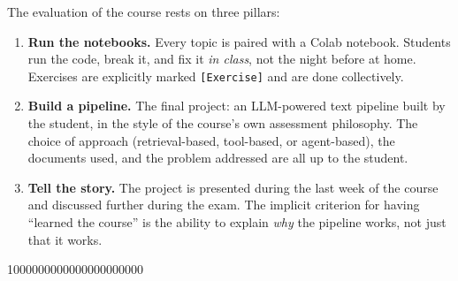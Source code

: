 The evaluation of the course rests on three pillars:

\begin{enumerate}
    \item \textbf{Run the notebooks.} Every topic is paired with a Colab notebook. Students run the code, break it, and fix it \emph{in class}, not the night before at home. Exercises are explicitly marked \texttt{[Exercise]} and are done collectively.

    \vspace{0.2cm}
    \item \textbf{Build a pipeline.} The final project: an LLM-powered text pipeline built by the student, in the style of the course's own assessment philosophy. The choice of approach (retrieval-based, tool-based, or agent-based), the documents used, and the problem addressed are all up to the student.

    \vspace{0.2cm}
    \item \textbf{Tell the story.} The project is presented during the last week of the course  and discussed further during the exam. The implicit criterion for having ``learned the course'' is the ability to explain \emph{why} the pipeline works, not just that it works.
\end{enumerate}






1000000000000000000000

